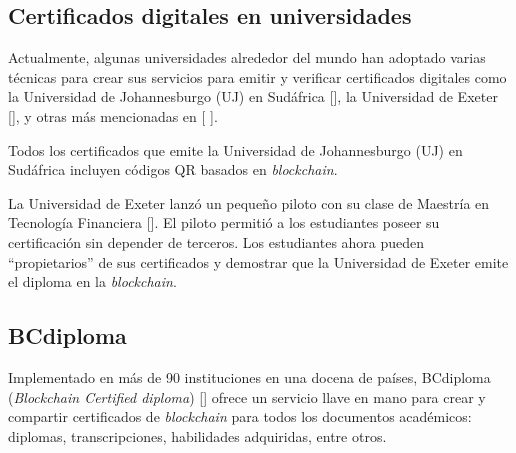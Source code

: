
\subsection{Certificados digitales en universidades}
Actualmente, algunas universidades alrededor del mundo han adoptado varias técnicas para crear sus servicios para emitir y verificar certificados digitales como la Universidad de Johannesburgo (UJ) en Sudáfrica [\cite{80}], la Universidad de Exeter [\cite{76}], y otras más mencionadas en [ \cite{1}]. 

Todos los certificados que emite la Universidad de Johannesburgo (UJ) en Sudáfrica incluyen códigos QR basados en \textit{blockchain}. 

La Universidad de Exeter lanzó un pequeño piloto con su clase de Maestría en Tecnología Financiera [\cite{76}]. El piloto permitió a los estudiantes poseer su certificación sin depender de terceros. Los estudiantes ahora pueden ``propietarios'' de sus certificados y demostrar que la Universidad de Exeter emite el diploma en la \textit{blockchain}.


\subsection{BCdiploma}
Implementado en más de 90 instituciones en una docena de países, BCdiploma (\textit{Blockchain Certified diploma}) [\cite{75}] ofrece un servicio llave en mano para crear y compartir certificados de \textit{blockchain} para todos los documentos académicos: diplomas, transcripciones, habilidades adquiridas, entre otros. 



